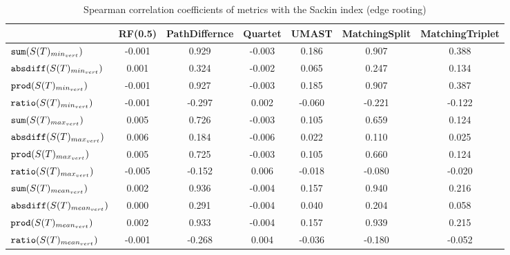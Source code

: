 \begin{table}[h]
\centering
\caption{Spearman correlation coefficients of metrics with the Sackin index (edge rooting)}
\begin{tabular}{lcccccc}
 & RF(0.5) & PathDiffernce & Quartet & UMAST & MatchingSplit & MatchingTriplet \\
\hline
${\verb+sum+}(S(T)_{min_{vert}})$ & -0.001 & 0.929 & -0.003 & 0.186 & 0.907 & 0.388 \\
${\verb+absdiff+}(S(T)_{min_{vert}})$ & 0.001 & 0.324 & -0.002 & 0.065 & 0.247 & 0.134 \\
${\verb+prod+}(S(T)_{min_{vert}})$ & -0.001 & 0.927 & -0.003 & 0.185 & 0.907 & 0.387 \\
${\verb+ratio+}(S(T)_{min_{vert}})$ & -0.001 & -0.297 & 0.002 & -0.060 & -0.221 & -0.122 \\
${\verb+sum+}(S(T)_{max_{vert}})$ & 0.005 & 0.726 & -0.003 & 0.105 & 0.659 & 0.124 \\
${\verb+absdiff+}(S(T)_{max_{vert}})$ & 0.006 & 0.184 & -0.006 & 0.022 & 0.110 & 0.025 \\
${\verb+prod+}(S(T)_{max_{vert}})$ & 0.005 & 0.725 & -0.003 & 0.105 & 0.660 & 0.124 \\
${\verb+ratio+}(S(T)_{max_{vert}})$ & -0.005 & -0.152 & 0.006 & -0.018 & -0.080 & -0.020 \\
${\verb+sum+}(S(T)_{mean_{vert}})$ & 0.002 & 0.936 & -0.004 & 0.157 & 0.940 & 0.216 \\
${\verb+absdiff+}(S(T)_{mean_{vert}})$ & 0.000 & 0.291 & -0.004 & 0.040 & 0.204 & 0.058 \\
${\verb+prod+}(S(T)_{mean_{vert}})$ & 0.002 & 0.933 & -0.004 & 0.157 & 0.939 & 0.215 \\
${\verb+ratio+}(S(T)_{mean_{vert}})$ & -0.001 & -0.268 & 0.004 & -0.036 & -0.180 & -0.052 \\
\end{tabular}
\end{table}

